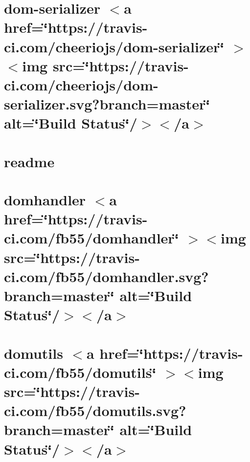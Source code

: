 \documentclass[twoside]{book}
\newcommand{\+}{\discretionary{\mbox{\scriptsize$\hookleftarrow$}}{}{}}
\begin{document}
\chapter{dom-\/serializer \texorpdfstring{$<$}{<}a href=\char`\"{}https\+://travis-\/ci.\+com/cheeriojs/dom-\/serializer\char`\"{} \texorpdfstring{$>$}{>}\texorpdfstring{$<$}{<}img src=\char`\"{}https\+://travis-\/ci.\+com/cheeriojs/dom-\/serializer.\+svg?branch=master\char`\"{} alt=\char`\"{}\+Build Status\char`\"{}/\texorpdfstring{$>$}{>}\texorpdfstring{$<$}{<}/a\texorpdfstring{$>$}{>}}
\label{md__c___users_vaishnavi_jadhav__desktop__developer_code_mean_stack_example_client_node_modules_dom_serializer__r_e_a_d_m_e}

\chapter{readme}
\label{md__c___users_vaishnavi_jadhav__desktop__developer_code_mean_stack_example_client_node_modules_domelementtype_readme}

\chapter{domhandler \texorpdfstring{$<$}{<}a href=\char`\"{}https\+://travis-\/ci.\+com/fb55/domhandler\char`\"{} \texorpdfstring{$>$}{>}\texorpdfstring{$<$}{<}img src=\char`\"{}https\+://travis-\/ci.\+com/fb55/domhandler.\+svg?branch=master\char`\"{} alt=\char`\"{}\+Build Status\char`\"{}/\texorpdfstring{$>$}{>}\texorpdfstring{$<$}{<}/a\texorpdfstring{$>$}{>}}
\label{md__c___users_vaishnavi_jadhav__desktop__developer_code_mean_stack_example_client_node_modules_domhandler_readme}

\chapter{domutils \texorpdfstring{$<$}{<}a href=\char`\"{}https\+://travis-\/ci.\+com/fb55/domutils\char`\"{} \texorpdfstring{$>$}{>}\texorpdfstring{$<$}{<}img src=\char`\"{}https\+://travis-\/ci.\+com/fb55/domutils.\+svg?branch=master\char`\"{} alt=\char`\"{}\+Build Status\char`\"{}/\texorpdfstring{$>$}{>}\texorpdfstring{$<$}{<}/a\texorpdfstring{$>$}{>}}
\label{md__c___users_vaishnavi_jadhav__desktop__developer_code_mean_stack_example_client_node_modules_domutils_readme}

\end{document}
